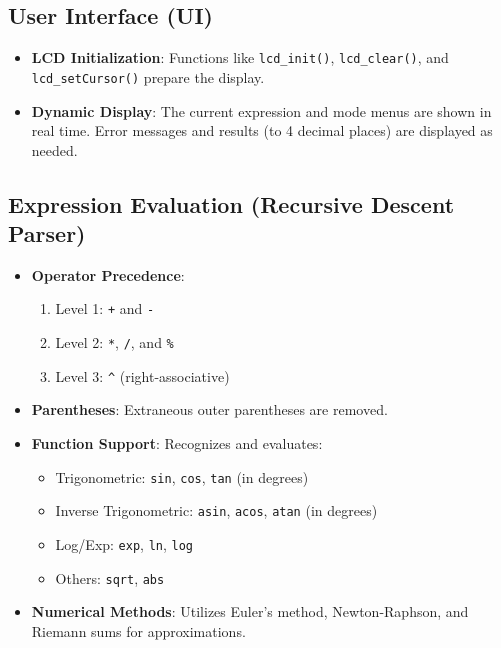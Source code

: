 \documentclass{article}
\theoremstyle{remark}
\begin{document}
\subsection{User Interface (UI)}
\begin{itemize}[noitemsep]
    \item \textbf{LCD Initialization}: Functions like \texttt{lcd\_init()}, \texttt{lcd\_clear()}, and \texttt{lcd\_setCursor()} prepare the display.
    \item \textbf{Dynamic Display}: The current expression and mode menus are shown in real time. Error messages and results (to 4 decimal places) are displayed as needed.
\end{itemize}

\subsection{Expression Evaluation (Recursive Descent Parser)}
\begin{itemize}[noitemsep]
    \item \textbf{Operator Precedence}: 
    \begin{enumerate}[noitemsep]
        \item Level 1: \texttt{+} and \texttt{-}
        \item Level 2: \texttt{*}, \texttt{/}, and \texttt{\%}
        \item Level 3: \texttt{\textasciicircum} (right-associative)
    \end{enumerate}
    \item \textbf{Parentheses}: Extraneous outer parentheses are removed.
    \item \textbf{Function Support}: Recognizes and evaluates:
    \begin{itemize}[noitemsep]
        \item Trigonometric: \texttt{sin}, \texttt{cos}, \texttt{tan} (in degrees)
        \item Inverse Trigonometric: \texttt{asin}, \texttt{acos}, \texttt{atan} (in degrees)
        \item Log/Exp: \texttt{exp}, \texttt{ln}, \texttt{log}
        \item Others: \texttt{sqrt}, \texttt{abs}
    \end{itemize}
    \item \textbf{Numerical Methods}: Utilizes Euler's method, Newton-Raphson, and Riemann sums for approximations.
\end{itemize}
\end{document}
